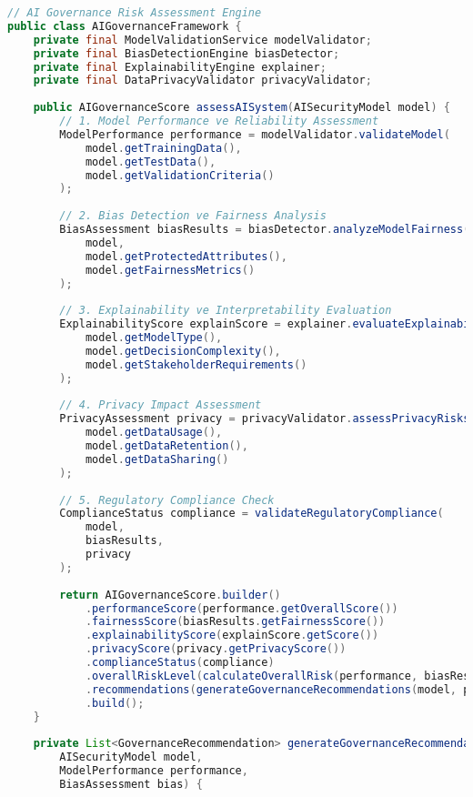 \begin{lstlisting}[breaklines=true,basicstyle=\ttfamily\footnotesize,language=Java]
// AI Governance Risk Assessment Engine
public class AIGovernanceFramework {
    private final ModelValidationService modelValidator;
    private final BiasDetectionEngine biasDetector;
    private final ExplainabilityEngine explainer;
    private final DataPrivacyValidator privacyValidator;
    
    public AIGovernanceScore assessAISystem(AISecurityModel model) {
        // 1. Model Performance ve Reliability Assessment
        ModelPerformance performance = modelValidator.validateModel(
            model.getTrainingData(),
            model.getTestData(),
            model.getValidationCriteria()
        );
        
        // 2. Bias Detection ve Fairness Analysis
        BiasAssessment biasResults = biasDetector.analyzeModelFairness(
            model,
            model.getProtectedAttributes(),
            model.getFairnessMetrics()
        );
        
        // 3. Explainability ve Interpretability Evaluation
        ExplainabilityScore explainScore = explainer.evaluateExplainability(
            model.getModelType(),
            model.getDecisionComplexity(),
            model.getStakeholderRequirements()
        );
        
        // 4. Privacy Impact Assessment
        PrivacyAssessment privacy = privacyValidator.assessPrivacyRisks(
            model.getDataUsage(),
            model.getDataRetention(),
            model.getDataSharing()
        );
        
        // 5. Regulatory Compliance Check
        ComplianceStatus compliance = validateRegulatoryCompliance(
            model,
            biasResults,
            privacy
        );
        
        return AIGovernanceScore.builder()
            .performanceScore(performance.getOverallScore())
            .fairnessScore(biasResults.getFairnessScore())
            .explainabilityScore(explainScore.getScore())
            .privacyScore(privacy.getPrivacyScore())
            .complianceStatus(compliance)
            .overallRiskLevel(calculateOverallRisk(performance, biasResults, explainScore, privacy))
            .recommendations(generateGovernanceRecommendations(model, performance, biasResults))
            .build();
    }
    
    private List<GovernanceRecommendation> generateGovernanceRecommendations(
        AISecurityModel model,
        ModelPerformance performance,
        BiasAssessment bias) {
        

\end{lstlisting}
